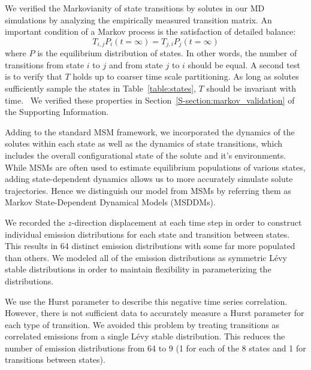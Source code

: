 \documentclass{article}
\begin{document}
  We verified the Markovianity of state transitions by solutes in our MD simulations 
  by analyzing the empirically measured transition matrix. An important condition
  of a Markov process is the satisfaction of detailed balance:
  \begin{equation}
  T_{i,j}P_i(t=\infty) = T_{j,i}P_j(t=\infty)
  \end{equation}
  where $P$ is the equilibrium distribution of states. In other words, the number of
  transitions from state $i$ to $j$ and from state $j$ to $i$ should be equal. A second
  test is to verify that $T$ holds up to coarser time scale partitioning. As long as solutes
  sufficiently sample the states in Table~\ref{table:states}, $T$ should be invariant
  with time.~\cite{swope_describing_2004} We verified these properties 
  in Section~\ref{S-section:markov_validation} of the Supporting Information.
  
  
  Adding to the standard MSM framework, we incorporated the dynamics of the solutes
  within each state as well as the dynamics of state transitions, which includes the
  overall configurational state of the solute and it's environments. 
  While MSMs are often used to estimate equilibrium populations of various states, adding 
  state-dependent dynamics allows us to more accurately simulate solute trajectories.
  Hence we distinguish our model from MSMs by referring them as Markov State-Dependent
  Dynamical Models (MSDDMs). 
  
  We recorded the $z$-direction displacement at each time step in order to construct 
  individual emission distributions for each state and transition between states. 
  This results in 64 distinct emission distributions with some far more populated than
  others. We modeled all of the emission distributions as symmetric L\'evy stable 
  distributions in order to maintain flexibility in parameterizing the distributions.
  
  We use the Hurst parameter to describe this negative time series correlation.
  However, there is not sufficient data to accurately measure a Hurst parameter for 
  each type of transition. We avoided this problem by treating transitions as correlated
  emissions from a single L\'evy stable distribution. This reduces the number of emission
  distributions from 64 to 9 (1 for each of the 8 states and 1 for transitions between states).  
  
\end{document}
